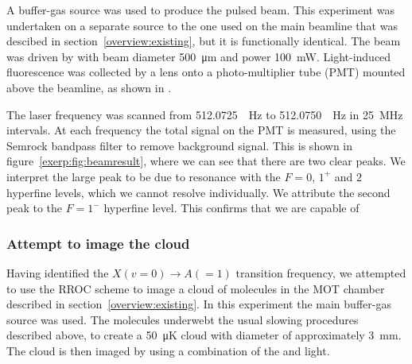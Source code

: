 A buffer-gas source  was used to produce the pulsed \CaF{} beam.  This
experiment was undertaken on a separate \CaF{} source to the one used on the
main beamline that was descibed in section~\ref{overview:existing}, but it is
functionally identical.  The beam was driven by  with beam
diameter \SI{500}{\micro\meter} and power \SI{100}{\milli\watt}.  Light-induced
fluorescence was collected by a lens onto a photo-multiplier tube (PMT) mounted
above the beamline, as shown in .

The laser frequency was scanned from \SI{512.0725}{\terra\hertz} to
\SI{512.0750}{\terra\hertz} in \SI{25}{\mega\hertz} intervals. At each
frequency the total signal on the PMT is measured, using the Semrock
bandpass filter to remove background signal. This is shown in
figure~\ref{exerp:fig:beamresult}, where we can see that there are two clear
peaks. We interpret the large peak to be due to resonance with the $F=0$, $1^+$
and $2$ hyperfine levels, which we cannot resolve individually. We attribute
the second peak to the $F=1^-$ hyperfine level. This confirms that we are
capable of 

\begin{figure}[htb]
  \centering
  \caption{}
  \label{exper:fig:beamresult}
\end{figure}

\subsubsection{Attempt to image the \CaF{} cloud}

Having identified the $X(v=0)\rightarrow A(=1)$ transition frequency, we
attempted to use the RROC scheme to image a cloud of \CaF{} molecules in the
MOT chamber described in section~\ref{overview:existing}. In this experiment
the main \CaF{} buffer-gas source was used. The molecules underwebt the usual
slowing procedures described above, to create a \SI{50}{\micro\kelvin} cloud
with diameter of approximately \SI{3}{\milli\meter}. The cloud is then imaged
by using a combination of the  and  light.

